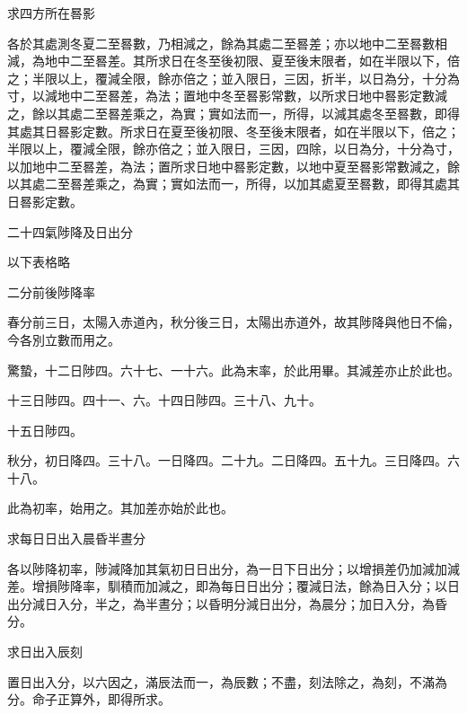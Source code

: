 \begin{pinyinscope}
 求四方所在晷影



 各於其處測冬夏二至晷數，乃相減之，餘為其處二至晷差；亦以地中二至晷數相減，為地中二至晷差。其所求日在冬至後初限、夏至後末限者，如在半限以下，倍之；半限以上，覆減全限，餘亦倍之；並入限日，三因，折半，以日為分，十分為寸，以減地中二至晷差，為法；置地中冬至晷影常數，以所求日地中晷影定數減之，餘以其處二至晷差乘之，為實；實如法而一，所得，以減其處冬至晷數，即得其處其日晷影定數。所求日在夏至後初限、冬至後末限者，如在半限以下，倍之；半限以上，覆減全限，餘亦倍之；並入限日，三因，四除，以日為分，十分為寸，以加地中二至晷差，為法；置所求日地中晷影定數，以地中夏至晷影常數減之，餘以其處二至晷差乘之，為實；實如法而一，所得，以加其處夏至晷數，即得其處其日晷影定數。



 二十四氣陟降及日出分



 以下表格略



 二分前後陟降率



 春分前三日，太陽入赤道內，秋分後三日，太陽出赤道外，故其陟降與他日不倫，今各別立數而用之。



 驚蟄，十二日陟四。六十七、一十六。此為末率，於此用畢。其減差亦止於此也。



 十三日陟四。四十一、六。十四日陟四。三十八、九十。



 十五日陟四。



 秋分，初日降四。三十八。一日降四。二十九。二日降四。五十九。三日降四。六十八。



 此為初率，始用之。其加差亦始於此也。



 求每日日出入晨昏半晝分



 各以陟降初率，陟減降加其氣初日日出分，為一日下日出分；以增損差仍加減加減差。增損陟降率，馴積而加減之，即為每日日出分；覆減日法，餘為日入分；以日出分減日入分，半之，為半晝分；以昏明分減日出分，為晨分；加日入分，為昏分。



 求日出入辰刻



 置日出入分，以六因之，滿辰法而一，為辰數；不盡，刻法除之，為刻，不滿為分。命子正算外，即得所求。




\end{pinyinscope}
